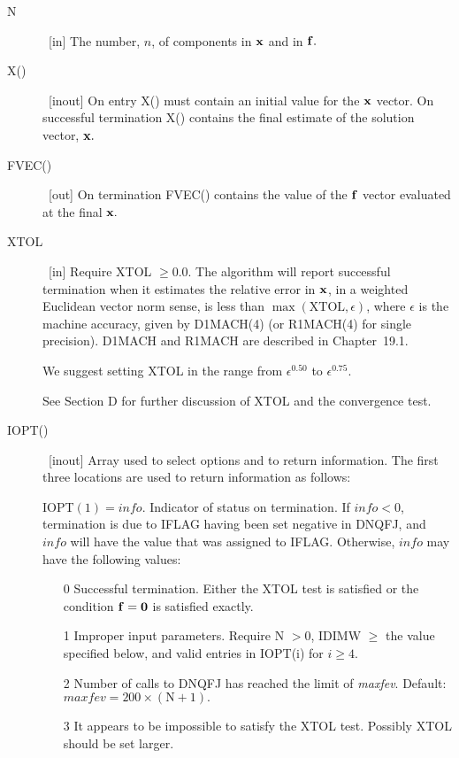 \documentclass[twoside]{MATH77}
\begin{document}
\begin{description}
\item[N]  \ [in] The number, $n$, of components in ${\bf x}$ and in ${\bf f}%
. $

\item[X()]  \ [inout] On entry X() must contain an initial value for the $%
{\bf x}$ vector. On successful termination X() contains the final estimate
of the solution vector, ${\bf x}.$

\item[FVEC()]  \ [out] On termination FVEC() contains the value of the ${\bf %
f}$ vector evaluated at the final ${\bf x}.$

\item[XTOL]  \ [in] Require XTOL $\geq 0.0$. The algorithm will report
successful termination when it estimates the relative error in ${\bf x}$, in
a weighted Euclidean vector norm sense, is less than $\max (\text{XTOL}%
,\epsilon )$, where $\epsilon $ is the machine accuracy, given by
D1MACH(4) (or R1MACH(4) for single precision).  D1MACH and R1MACH are
described in Chapter~19.1.

We suggest setting XTOL in the range from $\epsilon ^{0.50}$ to $%
\epsilon ^{0.75}.$

See Section D for further discussion of XTOL and the convergence test.

\item[IOPT()]  \ [inout] Array used to select options and to return
information. The first three locations are used to return information as
follows:

IOPT$(1)=info$. Indicator of status on termination. If $info<0$, termination
is due to IFLAG having been set negative in DNQFJ, and $info$ will have the
value that was assigned to IFLAG. Otherwise, $info$ may have the following
values:

\begin{itemize}
\item[0]  Successful termination. Either the XTOL test is satisfied or the
condition ${\bf f}={\bf 0}$ is satisfied exactly.

\item[1]  Improper input parameters. Require N $>0$, IDIMW $\geq $ the value
specified below, and valid entries in IOPT(i) for $i\geq 4.$

\item[2]  Number of calls to DNQFJ has reached the limit of {\em maxfev}. Default:
$maxfev =200\times (\text{N}+1).$

\item[3]  It appears to be impossible to satisfy the XTOL test. Possibly
XTOL should be set larger.


\end{itemize}
\end{description}
\end{document}
